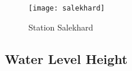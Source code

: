 \begin{figure}[htbp]
	\centering
	\texttt{[image: salekhard]} %
	\caption{Station Salekhard} 
	\label{fig:Salekhard}
\end{figure}
\subsection{Water Level Height}

\clearpage

